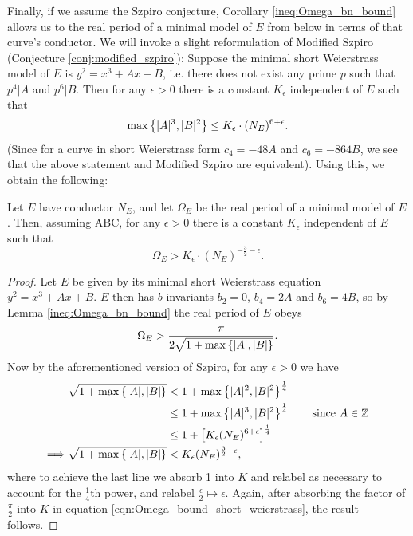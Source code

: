 Finally, if we assume the Szpiro conjecture, Corollary \ref{ineq:Omega_bn_bound} allows us to the real period of a minimal model of $E$ from below in terms of that curve's conductor. We will invoke a slight reformulation of Modified Szpiro (Conjecture \ref{conj:modified_szpiro}): Suppose the minimal short Weierstrass model of $E$ is $y^2 = x^3+Ax+B$, i.e. there does not exist any prime $p$ such that $p^4|A$ and $p^6|B$. Then for any $\epsilon>0$ there is a constant $K_{\epsilon}$ independent of $E$ such that
\begin{equation}
\max\left\{|A|^3,|B|^2\right\} \le K_{\epsilon}\cdot (N_E)^{6+\epsilon}.
\end{equation}
(Since for a curve in short Weierstrass form $c_4 = -48A$ and $c_6=-864B$, we see that the above statement and Modified Szpiro are equivalent). Using this, we obtain the following:
\begin{theorem}[ABC]
\label{thm:real_period_lower_bound}
Let $E$ have conductor $N_E$, and let $\Omega_E$ be the real period of a minimal model of $E$. Then, assuming ABC, for any $\epsilon>0$ there is a constant $K_{\epsilon}$ independent of $E$ such that 
\begin{equation}
\Omega_E > K_{\epsilon} \cdot (N_E)^{-\frac{3}{2}-\epsilon}.
\end{equation}
\end{theorem}
\begin{proof}
Let $E$ be given by its minimal short Weierstrass equation $y^2 = x^3+Ax+B$. $E$ then has $b$-invariants $b_2=0$, $b_4 = 2A$ and $b_6 = 4B$, so by Lemma \ref{ineq:Omega_bn_bound} the real period of $E$ obeys
\begin{equation}\label{eqn:Omega_bound_short_weierstrass}
\Omega_E > \frac{\pi}{2\sqrt{1+\max\left\{|A|,|B|\right\}}}.
\end{equation}
Now by the aforementioned version of Szpiro, for any $\epsilon>0$ we have
\begin{align*}
\sqrt{1+\max\left\{|A|,|B|\right\}} &<  1 + \max\left\{|A|^2,|B|^2\right\}^\frac{1}{4} \\
&\le 1 + \max\left\{|A|^3,|B|^2\right\}^\frac{1}{4} \quad\quad\mbox{since $A \in \mathbb{Z}$} \\
&\le 1 +\left[K_{\epsilon} (N_E)^{6+\epsilon} \right]^\frac{1}{4} \\
\Longrightarrow \sqrt{1+\max\left\{|A|,|B|\right\}} &< K_{\epsilon} (N_E)^{\frac{3}{2}+\epsilon},
\end{align*}
where to achieve the last line we absorb 1 into $K$ and relabel as necessary to account for the $\frac{1}{4}$th power, and relabel $\frac{\epsilon}{2} \mapsto \epsilon$. Again, after absorbing the factor of $\frac{\pi}{2}$ into $K$ in equation \ref{eqn:Omega_bound_short_weierstrass}, the result follows.
\end{proof}

